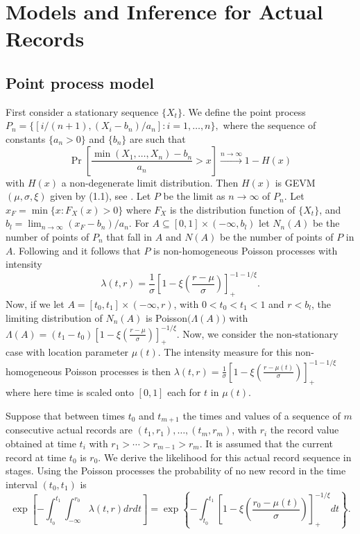 \documentclass[10pt]{article}
\begin{document}
\section{Models and Inference for Actual Records}

\subsection{Point process model}

First consider a stationary sequence $\{X_t\}$. We define the point
process $P_n = \{[i/(n+1),(X_i-b_n)/a_n]:i=1,\ldots,n\},$ 
where the sequence of constants $\{a_n > 0\}$ and $\{b_n\}$ are such that
\[\Pr\left[\frac{\min(X_1,\ldots,X_n)-b_n}{a_n} > x \right] \xrightarrow{n
  \rightarrow \infty} 1- H(x)\]
with $H(x)$ a non-degenerate limit distribution. Then
$H(x)$ is GEVM$(\mu,\sigma,\xi)$ given by (1.1), see \citet{Rootzen1983}.
Let $P$ be the limit as $n \rightarrow \infty$ of $P_n$. Let $x_F =
\min\{x:F_X(x)>0\}$ where $F_X$ is the distribution function of
$\{X_t\}$, and $b_l = \lim_{n \rightarrow \infty} (x_F-b_n)/a_n$. For
$A \subseteq [0,1]\times(-\infty,b_l)$ let $N_n(A)$
be the number of points of $P_n$ that fall in $A$ and $N(A)$ be the
number of points of $P$ in $A$. Following \cite{Pickands1971} and
\cite{Smith1989} it follows that $P$ is non-homogeneous Poisson processes
with intensity 
\begin{equation}
\lambda(t,r) = \frac{1}{\sigma}\left[
  1-\xi\left(\frac{r-\mu}{\sigma}\right)  \right]_+^{-1-1/\xi}.
\label{lambdatr}
\end{equation}
Now, if we let $A=[t_0,t_1] \times (-\infty,r)$, with $0<t_0<t_1<1$ and
$r < b_l$, the limiting distribution of $N_n(A)$ is
Poisson$\big(\Lambda(A)\big)$ with
$\Lambda(A)=(t_1-t_0)\left[1-\xi\left(\frac{r-\mu}{\sigma}\right)\right]_+^{-1/\xi}$.
Now, we consider the non-stationary case with location parameter
$\mu(t)$. The intensity measure for this non-homogeneous Poisson
processes is then $ \lambda(t,r) =
\frac{1}{\sigma}\left[1-\xi\left(\frac{r-\mu(t)}{\sigma}\right)\right]_+^{-1-1/\xi}$
where here time is scaled onto $[0,1]$ each for $t$ in $\mu(t)$.

Suppose that between times $t_0$ and $t_{m+1}$ the times and values of a
sequence of $m$ consecutive actual records are $(t_1,r_1), \ldots,
(t_m,r_m)$, with $r_i$ the record value obtained at time $t_i$ with
$ r_1 > \cdots > r_{m-1} > r_m$. It is assumed that the current record
at time $t_0$ is $r_0$. We derive the likelihood for this actual
record sequence in stages. Using the Poisson processes the
probability of no new record in the time interval $(t_0,t_1)$ is
\[\exp \left [-\int^{t_1}_{t_0}\int_{-\infty}^{r_0}\lambda(t,r)dr dt
\right] = 
\exp \left \{-\int^{t_1}_{t_0}\left [1-\xi\left ( \frac{r_0 -
        \mu(t)}{\sigma}\right)\right]^{-1/\xi}_+ dt \right\}. \]
\end{document}
